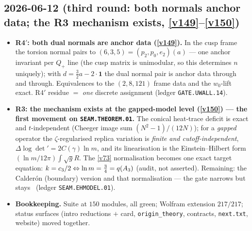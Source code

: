 \subsection*{2026-06-12 (third round: both normals anchor data; the R3 mechanism exists, \vref{v149}--\vref{v150})}
\begin{itemize}
\item \textbf{R4$'$: both dual normals are anchor data (\vref{v149}).} In the cusp frame
  the torsion normal pairs to $(6,3,5)=(p_2,p_0,e_2)(a)$ --- one anchor invariant per
  $Q_+$ line (the cusp matrix is unimodular, so this determines $n$ uniquely); with
  $d=\tfrac32a-2\cdot\mathbf1$ the dual normal pair is anchor data through and through.
  Equivalences to the $(2,8,121)$ frame data and the $w_0$-lift exact. R4$'$ residue $=$
  \emph{one} discrete assignment (ledger \texttt{GATE.UWALL.14}).
\item \textbf{R3: the mechanism exists at the gapped-model level (\vref{v150}) --- the
  first movement on \texttt{SEAM.THEOREM.01}.} The conical heat-trace deficit is exact
  and $t$-independent (Cheeger image sum $(N^2{-}1)/(12N)$); for a \emph{gapped}
  operator the $\zeta$-regularised replica variation is \emph{finite and
  cutoff-independent}, $\Delta\log\det'=2C(\gamma)\ln m$, and its linearisation is the
  Einstein--Hilbert form $(\ln m/12\pi)\int\!\sqrt gR$. The \vref{v73} normalisation
  becomes one exact target equation: $k=c_3/2\Leftrightarrow\ln m=\tfrac34=q(A_3)$
  (audit, not asserted). Remaining: the Calder\'on (boundary) version and that
  normalisation --- the gate narrows but stays \mO\ (ledger \texttt{SEAM.EHMODEL.01}).
\item \textbf{Bookkeeping.} Suite at $150$ modules, all green; Wolfram extension
  $217/217$; status surfaces (intro reductions $+$ card, \texttt{origin\_theory},
  contracts, \texttt{next.txt}, website) moved together.
\end{itemize}

